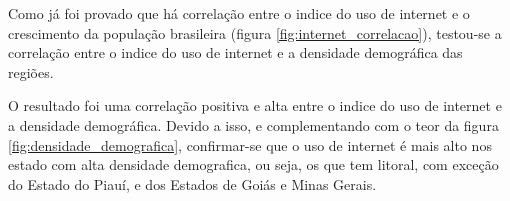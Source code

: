 Como já foi provado que há correlação entre o indice do uso de internet e o crescimento da população brasileira (figura \ref{fig:internet_correlacao}), testou-se a correlação entre o indice do uso de internet e a densidade demográfica das regiões.

O resultado foi uma correlação positiva e alta entre o indice do uso de internet e a densidade demográfica. Devido a isso, e complementando com o teor da figura \ref{fig:densidade_demografica}, confirmar-se que o uso de internet é mais alto nos estado com alta densidade demografica, ou seja, os que tem litoral, com exceção do Estado do Piauí, e dos Estados de Goiás e Minas Gerais.
